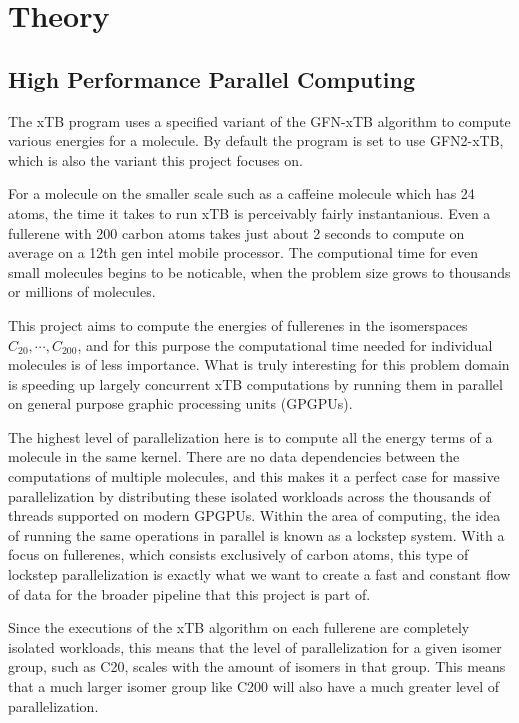 \section{Theory}

\subsection{High Performance Parallel Computing}

The xTB program uses a specified variant of the GFN-xTB algorithm to compute various energies for a molecule. By default the program is set to use GFN2-xTB, which is also the variant this project focuses on.

For a molecule on the smaller scale such as a caffeine molecule which has 24 atoms, the time it takes to run xTB is perceivably fairly instantanious. Even a fullerene with 200 carbon atoms takes just about 2 seconds to compute on average on a 12th gen intel mobile processor. The computional time for even small molecules begins to be noticable, when the problem size grows to thousands or millions of molecules.

This project aims to compute the energies of fullerenes in the isomerspaces \(C_{20}, \cdots, C_{200} \), and for this purpose the computational time needed for individual molecules is of less importance. What is truly interesting for this problem domain is speeding up largely concurrent xTB computations by running them in parallel on general purpose graphic processing units (GPGPUs).

The highest level of parallelization here is to compute all the energy terms of a molecule in the same kernel. There are no data dependencies between the computations of multiple molecules, and this makes it a perfect case for massive parallelization by distributing these isolated workloads across the thousands of threads supported on modern GPGPUs.
Within the area of computing, the idea of running the same operations in parallel is known as a lockstep system. With a focus on fullerenes, which consists exclusively of carbon atoms, this type of lockstep parallelization is exactly what we want to create a fast and constant flow of data for the broader pipeline that this project is part of.

Since the executions of the xTB algorithm on each fullerene are completely isolated workloads, this means that the level of parallelization for a given isomer group, such as C20, scales with the amount of isomers in that group. This means that a much larger isomer group like C200 will also have a much greater level of parallelization.


